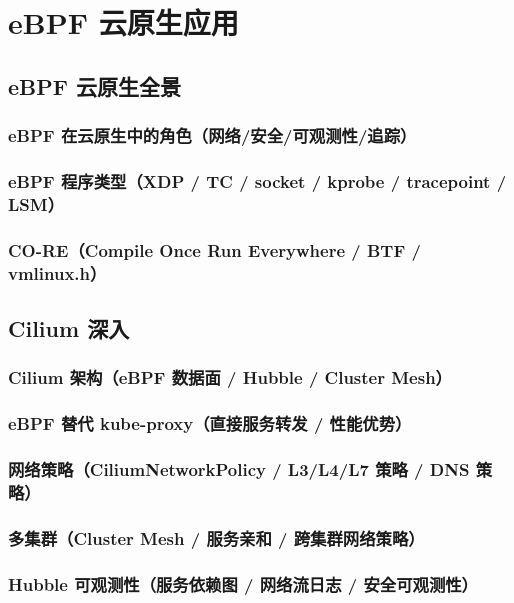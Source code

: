 \documentclass[12pt,UTF8]{ctexbook}
\begin{document}
\chapter{eBPF 云原生应用}
\label{chap:ebpf-cloud-native}

  \section{eBPF 云原生全景}
    \subsection{eBPF 在云原生中的角色（网络/安全/可观测性/追踪）}
    \subsection{eBPF 程序类型（XDP / TC / socket / kprobe / tracepoint / LSM）}
    \subsection{CO-RE（Compile Once Run Everywhere / BTF / vmlinux.h）}

  \section{Cilium 深入}
    \subsection{Cilium 架构（eBPF 数据面 / Hubble / Cluster Mesh）}
    \subsection{eBPF 替代 kube-proxy（直接服务转发 / 性能优势）}
    \subsection{网络策略（CiliumNetworkPolicy / L3/L4/L7 策略 / DNS 策略）}
    \subsection{多集群（Cluster Mesh / 服务亲和 / 跨集群网络策略）}
    \subsection{Hubble 可观测性（服务依赖图 / 网络流日志 / 安全可观测性）}
\end{document}
